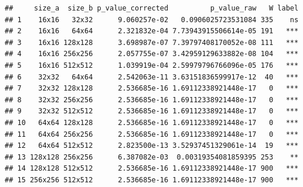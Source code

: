 \documentclass[
]{book}
\newenvironment{Shaded}{\begin{snugshade}}{\end{snugshade}}
\newcommand{\DataTypeTok}[1]{\textcolor[rgb]{0.13,0.29,0.53}{#1}}
\newcommand{\FloatTok}[1]{\textcolor[rgb]{0.00,0.00,0.81}{#1}}
\newcommand{\KeywordTok}[1]{\textcolor[rgb]{0.13,0.29,0.53}{\textbf{#1}}}
\newcommand{\NormalTok}[1]{#1}
\newcommand{\OperatorTok}[1]{\textcolor[rgb]{0.81,0.36,0.00}{\textbf{#1}}}
\newcommand{\StringTok}[1]{\textcolor[rgb]{0.31,0.60,0.02}{#1}}
\begin{document}
\begin{Shaded}
\end{Shaded}

\begin{verbatim}
##     size_a  size_b p_value_corrected          p_value_raw   W label
## 1    16x16   32x32      9.060257e-02   0.0906025723531084 335    ns
## 2    16x16   64x64      2.321832e-04 7.73943915506614e-05 191   ***
## 3    16x16 128x128      3.698987e-07 7.39797408170052e-08 111   ***
## 4    16x16 256x256      2.057755e-07 3.42959129633882e-08 104   ***
## 5    16x16 512x512      1.039919e-04 2.59979796766096e-05 176   ***
## 6    32x32   64x64      2.542063e-11 3.63151836599917e-12  40   ***
## 7    32x32 128x128      2.536685e-16 1.69112338921448e-17   0   ***
## 8    32x32 256x256      2.536685e-16 1.69112338921448e-17   0   ***
## 9    32x32 512x512      2.536685e-16 1.69112338921448e-17   0   ***
## 10   64x64 128x128      2.536685e-16 1.69112338921448e-17   0   ***
## 11   64x64 256x256      2.536685e-16 1.69112338921448e-17   0   ***
## 12   64x64 512x512      2.823500e-13 3.52937451329061e-14  19   ***
## 13 128x128 256x256      6.387082e-03  0.00319354081859395 253    **
## 14 128x128 512x512      2.536685e-16 1.69112338921448e-17 900   ***
## 15 256x256 512x512      2.536685e-16 1.69112338921448e-17 900   ***
\end{verbatim}
\end{document}
